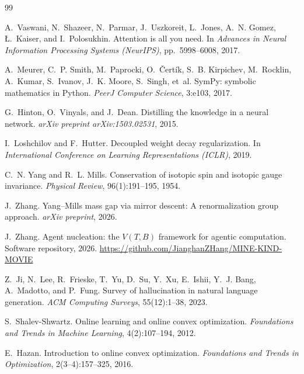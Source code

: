 \documentclass[11pt,a4paper]{article}
\begin{document}
\begin{thebibliography}{99}

A.~Vaswani, N.~Shazeer, N.~Parmar, J.~Uszkoreit, L.~Jones,
A.~N. Gomez, \L.~Kaiser, and I.~Polosukhin.
\newblock Attention is all you need.
\newblock In \emph{Advances in Neural Information Processing
Systems (NeurIPS)}, pp.~5998--6008, 2017.

A.~Meurer, C.~P. Smith, M.~Paprocki, O.~\v{C}ert\'{i}k,
S.~B. Kirpichev, M.~Rocklin, A.~Kumar, S.~Ivanov,
J.~K. Moore, S.~Singh, et~al.
\newblock SymPy: symbolic mathematics in Python.
\newblock \emph{PeerJ Computer Science}, 3:e103, 2017.

G.~Hinton, O.~Vinyals, and J.~Dean.
\newblock Distilling the knowledge in a neural network.
\newblock \emph{arXiv preprint arXiv:1503.02531}, 2015.

I.~Loshchilov and F.~Hutter.
\newblock Decoupled weight decay regularization.
\newblock In \emph{International Conference on Learning
Representations (ICLR)}, 2019.

C.~N. Yang and R.~L. Mills.
\newblock Conservation of isotopic spin and isotopic gauge
invariance.
\newblock \emph{Physical Review}, 96(1):191--195, 1954.

J.~Zhang.
\newblock Yang--Mills mass gap via mirror descent:
A renormalization group approach.
\newblock \emph{arXiv preprint}, 2026.

J.~Zhang.
\newblock Agent nucleation: the $V(T,B)$ framework for
agentic computation.
\newblock Software repository, 2026.
\newblock \url{https://github.com/JianghanZHang/MINE-KIND-MOVIE}

Z.~Ji, N.~Lee, R.~Frieske, T.~Yu, D.~Su, Y.~Xu,
E.~Ishii, Y.~J. Bang, A.~Madotto, and P.~Fung.
\newblock Survey of hallucination in natural language
generation.
\newblock \emph{ACM Computing Surveys}, 55(12):1--38, 2023.

S.~Shalev-Shwartz.
\newblock Online learning and online convex optimization.
\newblock \emph{Foundations and Trends in Machine Learning},
4(2):107--194, 2012.

E.~Hazan.
\newblock Introduction to online convex optimization.
\newblock \emph{Foundations and Trends in Optimization},
2(3--4):157--325, 2016.


\end{thebibliography}
\end{document}
